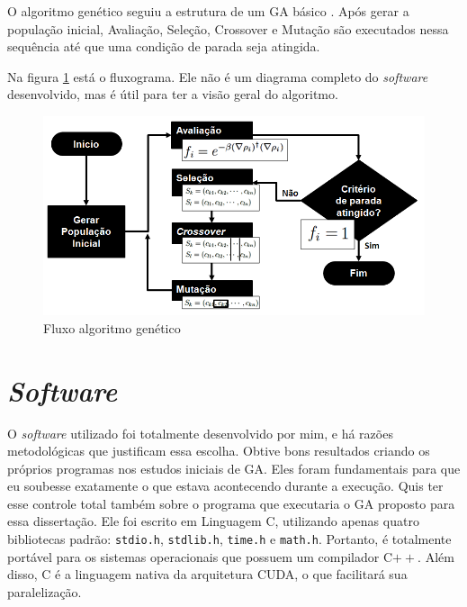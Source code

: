 	O algoritmo genético seguiu a estrutura de um GA básico \cite{Mitchell98, Linden2008}. Após gerar a população inicial, Avaliação, Seleção, Crossover e Mutação são executados nessa sequência até que uma condição de parada seja atingida.
	
	Na figura \ref{fig:fluxo} está o fluxograma. Ele não é um diagrama completo do \emph{software} desenvolvido, mas é útil para ter a visão geral do algoritmo.

\begin{figure}[htbp]
	\centering
		\includegraphics[width=1.00\textwidth]{figs/materiais_metodo/autovalores_com_ga/fluxo.png}
	\caption{Fluxo algoritmo genético}
	\label{fig:fluxo}
\end{figure}


\section{\emph{Software}}

	O \emph{software} utilizado foi totalmente desenvolvido por mim, e há razões metodológicas que justificam essa escolha. Obtive bons resultados criando os próprios programas nos estudos iniciais de GA. Eles foram fundamentais para que eu soubesse exatamente o que estava acontecendo durante a execução. Quis ter esse controle total também sobre o programa que executaria o GA proposto para essa dissertação. Ele foi escrito em Linguagem C, utilizando apenas quatro bibliotecas padrão: \texttt{stdio.h}, \texttt{stdlib.h}, \texttt{time.h} e \texttt{math.h}. Portanto, é totalmente portável para os sistemas operacionais que possuem um compilador C$++$. Além disso, C é a linguagem nativa da arquitetura CUDA, o que facilitará sua paralelização.
	
